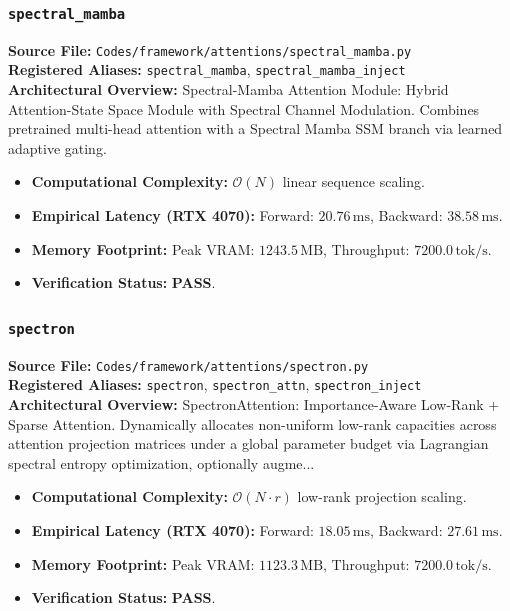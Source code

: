 \subsubsection{\texttt{spectral\_mamba}}
\textbf{Source File:} \texttt{Codes/framework/attentions/spectral\_mamba.py} \\
\textbf{Registered Aliases:} \texttt{spectral\_mamba}, \texttt{spectral\_mamba\_inject} \\
\textbf{Architectural Overview:} Spectral-Mamba Attention Module: Hybrid Attention-State Space Module with Spectral Channel Modulation. Combines pretrained multi-head attention with a Spectral Mamba SSM branch via learned adaptive gating.

\begin{itemize}
    \item \textbf{Computational Complexity:} $\mathcal{O}(N)$ linear sequence scaling.
    \item \textbf{Empirical Latency (RTX 4070):} Forward: $20.76\,\text{ms}$, Backward: $38.58\,\text{ms}$.
    \item \textbf{Memory Footprint:} Peak VRAM: $1243.5\,\text{MB}$, Throughput: $7200.0\,\text{tok/s}$.
    \item \textbf{Verification Status:} \textbf{PASS}.
\end{itemize}

\subsubsection{\texttt{spectron}}
\textbf{Source File:} \texttt{Codes/framework/attentions/spectron.py} \\
\textbf{Registered Aliases:} \texttt{spectron}, \texttt{spectron\_attn}, \texttt{spectron\_inject} \\
\textbf{Architectural Overview:} SpectronAttention: Importance-Aware Low-Rank + Sparse Attention. Dynamically allocates non-uniform low-rank capacities across attention projection matrices under a global parameter budget via Lagrangian spectral entropy optimization, optionally augme...

\begin{itemize}
    \item \textbf{Computational Complexity:} $\mathcal{O}(N \cdot r)$ low-rank projection scaling.
    \item \textbf{Empirical Latency (RTX 4070):} Forward: $18.05\,\text{ms}$, Backward: $27.61\,\text{ms}$.
    \item \textbf{Memory Footprint:} Peak VRAM: $1123.3\,\text{MB}$, Throughput: $7200.0\,\text{tok/s}$.
    \item \textbf{Verification Status:} \textbf{PASS}.
\end{itemize}

